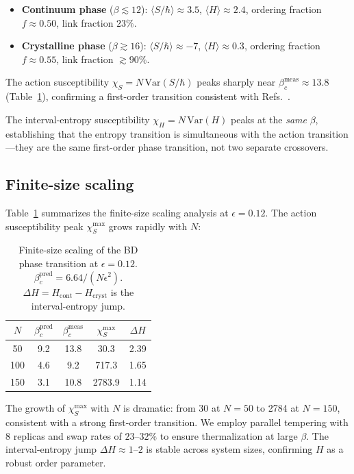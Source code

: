 \documentclass[aps,prd,twocolumn,superscriptaddress,nofootinbib]{revtex4-2}
\begin{document}
\begin{itemize}
\item \textbf{Continuum phase} ($\beta \lesssim 12$): $\langle S/\hbar \rangle \approx 3.5$, $\langle H \rangle \approx 2.4$, ordering fraction $f \approx 0.50$, link fraction $23\%$.
\item \textbf{Crystalline phase} ($\beta \gtrsim 16$): $\langle S/\hbar \rangle \approx -7$, $\langle H \rangle \approx 0.3$, ordering fraction $f \approx 0.55$, link fraction $\gtrsim 90\%$.
\end{itemize}

The action susceptibility $\chi_S = N \,\mathrm{Var}(S/\hbar)$ peaks sharply near $\beta_c^{\mathrm{meas}} \approx 13.8$ (Table~\ref{tab:fss}), confirming a first-order transition consistent with Refs.~\cite{surya2012,glaser2018}.

The interval-entropy susceptibility $\chi_H = N \, \mathrm{Var}(H)$ peaks at the \emph{same} $\beta$, establishing that the entropy transition is simultaneous with the action transition---they are the same first-order phase transition, not two separate crossovers.

\subsection{Finite-size scaling}

Table~\ref{tab:fss} summarizes the finite-size scaling analysis at $\epsilon = 0.12$. The action susceptibility peak $\chi_S^{\max}$ grows rapidly with $N$:

\begin{table}[h]
\centering
\begin{tabular}{ccccc}
\toprule
$N$ & $\beta_c^{\mathrm{pred}}$ & $\beta_c^{\mathrm{meas}}$ & $\chi_S^{\max}$ & $\Delta H$ \\
\midrule
50 & 9.2 & 13.8 & 30.3 & 2.39 \\
100 & 4.6 & 9.2 & 717.3 & 1.65 \\
150 & 3.1 & 10.8 & 2783.9 & 1.14 \\
\bottomrule
\end{tabular}
\caption{Finite-size scaling of the BD phase transition at $\epsilon = 0.12$. $\beta_c^{\mathrm{pred}} = 6.64/(N\epsilon^2)$. $\Delta H = H_{\mathrm{cont}} - H_{\mathrm{cryst}}$ is the interval-entropy jump.}
\label{tab:fss}
\end{table}

The growth of $\chi_S^{\max}$ with $N$ is dramatic: from 30 at $N=50$ to 2784 at $N=150$, consistent with a strong first-order transition. We employ parallel tempering with 8 replicas and swap rates of $23$--$32\%$ to ensure thermalization at large $\beta$. The interval-entropy jump $\Delta H \approx 1$--$2$ is stable across system sizes, confirming $H$ as a robust order parameter.
\end{document}
